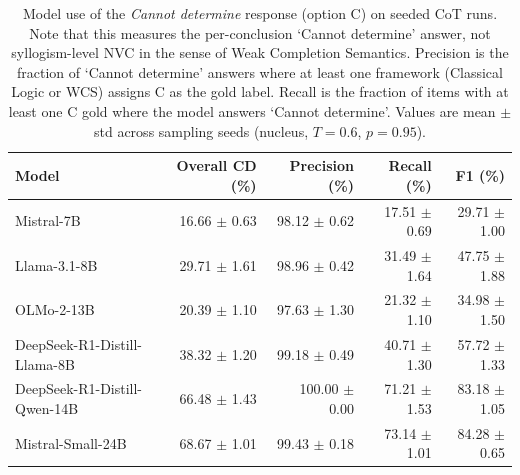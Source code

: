 \begin{table}[htbp]
\caption{Model use of the \emph{Cannot determine} response (option C) on seeded CoT runs. Note that this measures the per-conclusion `Cannot determine' answer, not syllogism-level NVC in the sense of Weak Completion Semantics. Precision is the fraction of `Cannot determine' answers where at least one framework (Classical Logic or WCS) assigns C as the gold label. Recall is the fraction of items with at least one C gold where the model answers `Cannot determine'. Values are mean $\pm$ std across sampling seeds (nucleus, $T=0.6$, $p=0.95$).}
\label{tab:cannot-determine-analysis}
\begin{tabular}{lrrrr}
\toprule
Model & Overall CD (\%) & Precision (\%) & Recall (\%) & F1 (\%) \\
\midrule
Mistral-7B & 16.66 $\pm$ 0.63 & 98.12 $\pm$ 0.62 & 17.51 $\pm$ 0.69 & 29.71 $\pm$ 1.00 \\
Llama-3.1-8B & 29.71 $\pm$ 1.61 & 98.96 $\pm$ 0.42 & 31.49 $\pm$ 1.64 & 47.75 $\pm$ 1.88 \\
OLMo-2-13B & 20.39 $\pm$ 1.10 & 97.63 $\pm$ 1.30 & 21.32 $\pm$ 1.10 & 34.98 $\pm$ 1.50 \\
DeepSeek-R1-Distill-Llama-8B & 38.32 $\pm$ 1.20 & 99.18 $\pm$ 0.49 & 40.71 $\pm$ 1.30 & 57.72 $\pm$ 1.33 \\
DeepSeek-R1-Distill-Qwen-14B & 66.48 $\pm$ 1.43 & 100.00 $\pm$ 0.00 & 71.21 $\pm$ 1.53 & 83.18 $\pm$ 1.05 \\
Mistral-Small-24B & 68.67 $\pm$ 1.01 & 99.43 $\pm$ 0.18 & 73.14 $\pm$ 1.01 & 84.28 $\pm$ 0.65 \\
\bottomrule
\end{tabular}
\end{table}
